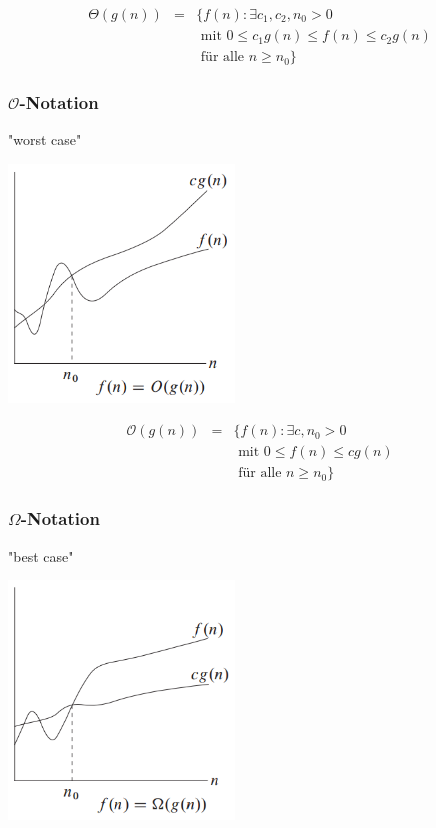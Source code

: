 \documentclass[10pt,a4paper,twocolumn]{article}
\begin{document}
\[
\begin{array}{rcl}
	\Theta(g(n)) & = & \{f(n):\exists c_1,c_2,n_0>0 \\
	& & \text{ mit }0\leq c_1g(n)\leq f(n)\leq c_2g(n) \\
	& & \text{ für alle }n\geq n_0\}
\end{array}
\]


\subsubsection{$\mathcal{O}$-Notation}
"worst case"
\begin{center}
\includegraphics[width=6cm]{images/asymptotische-notation-bigoh.png}
\end{center}

\[
\begin{array}{rcl}
	\mathcal{O}(g(n)) & = & \{f(n):\exists c,n_0>0 \\
	& & \text{ mit }0\leq f(n)\leq cg(n) \\
	& & \text{ für alle }n\geq n_0\}
\end{array}
\]

\subsubsection{$\Omega$-Notation}
"best case"
\begin{center}
\includegraphics[width=6cm]{images/asymptotische-notation-omega.png}
\end{center}
\end{document}
